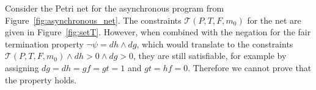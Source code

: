 Consider the Petri net for the asynchronous program from
Figure~\ref{fig:asynchronous_net}.
The constraints $\mathcal{T}(P, T, F, m_0)$ for the net are
given in Figure~\ref{fig:setT}. However, when combined with
the negation for the fair termination property
$\neg\psi = dh \land dg$, which would translate to the constraints
$\mathcal{T}(P, T, F, m_0) \land dh > 0 \land dg > 0$, they are still satisfiable,
for example by assigning $dg = dh = gf = gt = 1$ and $gt = hf = 0$.
Therefore we cannot prove that the property holds.








